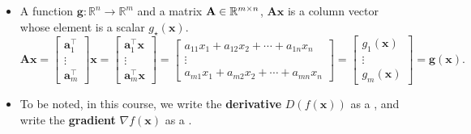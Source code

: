 \documentclass[12pt,thmsa]{article}
\begin{document}
\begin{itemize}
	\item A function \(\boldsymbol{g}: \mathbb{R}^{n} \rightarrow \mathbb{R}^{m}\) and a matrix \(\mathbf{A} \in \mathbb{R}^{\color{black}{m} \times \color{black}{n}} \), \( \mathbf{A} \boldsymbol{x} \) is a column vector whose element is a scalar \(g_{\star}(\boldsymbol{x})\). 
	\[ \mathbf{A} \boldsymbol{x}
	=\left[
	\begin{array}{c}{\boldsymbol{a}_{1}^{\top}} \\ {\vdots} \\ {\boldsymbol{a}_{m}^{\top}}\end{array}
	\right] \boldsymbol{x}
	=\left[
	\begin{array}{c}{
			\boldsymbol{a}_{1}^{\top} \boldsymbol{x}} \\ 
		{\vdots} \\ 
		{\boldsymbol{a}_{m}^{\top}\boldsymbol{x}}
	\end{array}
	\right]
	=\left[
	\begin{array}{c}{
			a_{11} x_{1}+a_{12} x_{2}+\cdots+a_{1 n} x_{n}} \\ 
		{\vdots} \\ 
		{a_{m 1} x_{1}+a_{m 2} x_{2}+\cdots+a_{m n} x_{n}}
	\end{array}
	\right]
	=\left[
	\begin{array}{c}{
			g_{1}(\boldsymbol{x})} \\ 
		{\vdots} \\ 
		{g_{m}(\boldsymbol{x})}
	\end{array}
	\right]
	= \boldsymbol{g}(\boldsymbol{x}).
	\]

	\item To be noted, in this course, we write the \textbf{derivative} \(D( f(\boldsymbol{x})  ) \) as a {\color{red}{row vector}}, and write the \textbf{gradient} \( \nabla f(\boldsymbol{x}) \) as a {\color{blue}{column vector}}.
		
\end{itemize}
\end{document}
